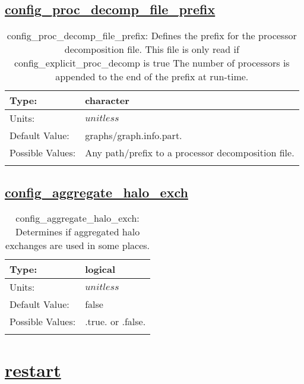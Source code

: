 \subsection[config\_proc\_decomp\_file\_prefix]{\hyperref[sec:nm_tab_decomposition]{config\_proc\_decomp\_file\_prefix}}
\label{subsec:nm_sec_config_proc_decomp_file_prefix}
\begin{center}
\begin{longtable}{| p{2.0in} || p{4.0in} |}
    \hline
    Type: & character \\
    \hline
    Units: & $unitless$ \\
    \hline
    Default Value: & graphs/graph.info.part. \\
    \hline
    Possible Values: & Any path/prefix to a processor decomposition file. \\
    \hline
    \caption{config\_proc\_decomp\_file\_prefix: Defines the prefix for the processor decomposition file. This file is only read if config\_explicit\_proc\_decomp is true The number of processors is appended to the end of the prefix at run-time.}
\end{longtable}
\end{center}
\subsection[config\_aggregate\_halo\_exch]{\hyperref[sec:nm_tab_decomposition]{config\_aggregate\_halo\_exch}}
\label{subsec:nm_sec_config_aggregate_halo_exch}
\begin{center}
\begin{longtable}{| p{2.0in} || p{4.0in} |}
    \hline
    Type: & logical \\
    \hline
    Units: & $unitless$ \\
    \hline
    Default Value: & false \\
    \hline
    Possible Values: & .true. or .false. \\
    \hline
    \caption{config\_aggregate\_halo\_exch: Determines if aggregated halo exchanges are used in some places.}
\end{longtable}
\end{center}
\section[restart]{\hyperref[sec:nm_tab_restart]{restart}}
\label{sec:nm_sec_restart}
